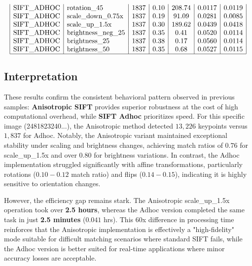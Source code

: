 \documentclass[conference]{IEEEtran}
\begin{document}
$$\begin{array}{|l|l|c|c|c|c|c|}
\text{SIFT\_ADHOC} & \text{rotation\_45} & 1837 & 0.10 & 208.74 & 0.0117 & 0.0119 \\
\text{SIFT\_ADHOC} & \text{scale\_down\_0.75x} & 1837 & 0.19 & 91.09 & 0.0281 & 0.0085 \\
\text{SIFT\_ADHOC} & \text{scale\_up\_1.5x} & 1837 & 0.30 & 189.62 & 0.0439 & 0.0418 \\
\text{SIFT\_ADHOC} & \text{brightness\_neg\_25} & 1837 & 0.35 & 0.41 & 0.0520 & 0.0114 \\
\text{SIFT\_ADHOC} & \text{brightness\_25} & 1837 & 0.38 & 0.17 & 0.0560 & 0.0114 \\
\text{SIFT\_ADHOC} & \text{brightness\_50} & 1837 & 0.35 & 0.68 & 0.0527 & 0.0115 \\ \hline
\end{array}$$



\subsection*{Interpretation}


These results confirm the consistent behavioral pattern observed in previous samples: \textbf{Anisotropic SIFT} provides superior robustness at the cost of high computational overhead, while \textbf{SIFT Adhoc} prioritizes speed. For this specific image (2481823240...), the Anisotropic method detected $13,226$ keypoints versus $1,837$ for Adhoc. Notably, the Anisotropic variant maintained exceptional stability under scaling and brightness changes, achieving match ratios of $0.76$ for scale_up_1.5x and over $0.80$ for brightness variations. In contrast, the Adhoc implementation struggled significantly with affine transformations, particularly rotations ($0.10 - 0.12$ match ratio) and flips ($0.14 - 0.15$), indicating it is highly sensitive to orientation changes.

However, the efficiency gap remains stark. The Anisotropic scale_up_1.5x operation took over \textbf{2.5 hours}, whereas the Adhoc version completed the same task in just \textbf{2.5 minutes} ($0.041$ hrs). This 60x difference in processing time reinforces that the Anisotropic implementation is effectively a "high-fidelity" mode suitable for difficult matching scenarios where standard SIFT fails, while the Adhoc version is better suited for real-time applications where minor accuracy losses are acceptable.
\end{document}
